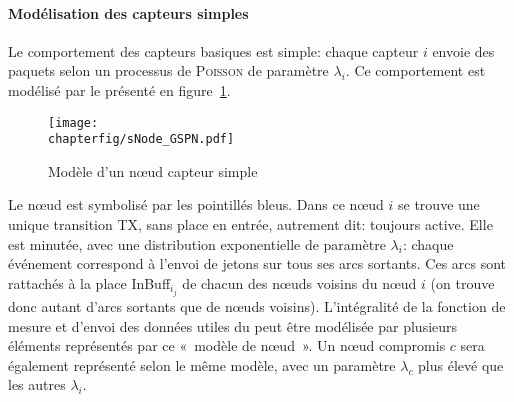             \paragraph{Modélisation des capteurs simples}
Le comportement des capteurs basiques est simple: chaque capteur $i$ envoie des paquets selon un processus de \textsc{Poisson} de paramètre $\lambda_i$.
Ce comportement est modélisé par le \rpsg présenté en figure~\ref{sa:fig:snodegspn}.
\begin{figure}[H]
    \centering
    \texttt{[image: \\chapterfig/sNode\_GSPN.pdf]}
    \caption{Modèle \rpsg d'un nœud capteur simple}\label{sa:fig:snodegspn}
\end{figure}
Le nœud est symbolisé par les pointillés bleus.
Dans ce nœud $i$ se trouve une unique transition \textsf{TX}, sans place en entrée, autrement dit: toujours active.
Elle est minutée, avec une distribution exponentielle de paramètre $\lambda_i$: chaque événement correspond à l'envoi de jetons sur tous ses arcs sortants.
Ces arcs sont rattachés à la place \textsf{InBuff$_{i_j}$} de chacun des nœuds voisins du nœud $i$ (on trouve donc autant d'arcs sortants que de nœuds voisins).
L'intégralité de la fonction de mesure et d'envoi des données utiles du \rc peut être modélisée par plusieurs éléments représentés par ce «~modèle de nœud~».
Un nœud compromis $c$ sera également représenté selon le même modèle, avec un paramètre $\lambda_c$ plus élevé que les autres $\lambda_i$.

